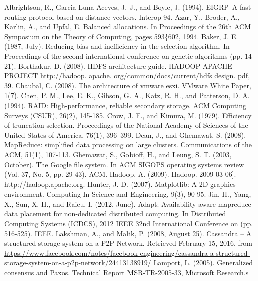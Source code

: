 \documentclass[12pt]{article}
\begin{document}
\newpage
\FloatBarrier
 \begin{thebibliography}{99}

   Albrightson, R., Garcia-Luna-Aceves, J. J., and Boyle, J.  (1994). EIGRP--A fast routing protocol based on distance vectors. Interop 94.
   Azar, Y., Broder, A., Karlin, A., and Upfal, E. Balanced allocations. In Proceedings of the 26th ACM Symposium on the Theory of Computing, pages 593\{602, 1994.
   Baker, J. E. (1987, July). Reducing bias and inefficiency in the selection algorithm. In Proceedings of the second international conference on genetic algorithms (pp. 14-21).
   Borthakur, D. (2008). HDFS architecture guide. HADOOP APACHE PROJECT http://hadoop. apache. org/common/docs/current/hdfs design. pdf, 39.
   Chaubal, C. (2008). The architecture of vmware esxi. VMware White Paper, 1(7).
   Chen, P. M., Lee, E. K., Gibson, G. A., Katz, R. H., and Patterson, D. A. (1994). RAID: High-performance, reliable secondary storage. ACM Computing Surveys (CSUR), 26(2), 145-185.
   Crow, J. F., and Kimura, M. (1979). Efficiency of truncation selection. Proceedings of the National Academy of Sciences of the United States of America, 76(1), 396–399.
   Dean, J., and Ghemawat, S. (2008). MapReduce: simplified data processing on large clusters. Communications of the ACM, 51(1), 107-113.
   Ghemawat, S., Gobioff, H., and Leung, S. T. (2003, October). The Google file system. In ACM SIGOPS operating systems review (Vol. 37, No.  5, pp. 29-43). ACM.
   Hadoop, A. (2009). Hadoop. 2009-03-06].  \url{http://hadoop.apache.org}.
   Hunter, J. D. (2007). Matplotlib: A 2D graphics environment. Computing In Science and Engineering, 9(3), 90-95.
   Jin, H., Yang, X., Sun, X. H., and Raicu, I. (2012, June). Adapt: Availability-aware mapreduce data placement for non-dedicated distributed computing. In Distributed Computing Systems (ICDCS), 2012 IEEE 32nd International Conference on (pp. 516-525). IEEE.
   Lakshman, A., and Malik, P. (2008, August 25). Cassandra – A structured storage system on a P2P Network. Retrieved February 15, 2016, from \url{https://www.facebook.com/notes/facebook-engineering/cassandra-a-structured-storage-system-on-a-p2p-network/24413138919/}
   Lamport, L. (2005). Generalized consensus and Paxos. Technical Report MSR-TR-2005-33, Microsoft Research.s

\end{thebibliography}
\end{document}
